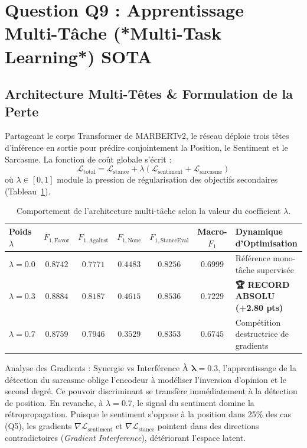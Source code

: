 \documentclass[11pt,a4paper]{article}
\begin{document}
\section{Question Q9 : Apprentissage Multi-Tâche (*Multi-Task Learning*) SOTA}

\subsection{Architecture Multi-Têtes \& Formulation de la Perte}
Partageant le corps Transformer de MARBERTv2, le réseau déploie trois têtes d'inférence en sortie pour prédire conjointement la Position, le Sentiment et le Sarcasme. La fonction de coût globale s'écrit :
\begin{equation}
    \mathcal{L}_{\text{total}} = \mathcal{L}_{\text{stance}} + \lambda \left(\mathcal{L}_{\text{sentiment}} + \mathcal{L}_{\text{sarcasme}}\right)
\end{equation}
où $\lambda \in [0, 1]$ module la pression de régularisation des objectifs secondaires (Tableau~\ref{tab:multitask}).

\begin{table}[htbp]
\centering
\caption{Comportement de l'architecture multi-tâche selon la valeur du coefficient $\lambda$.}
\label{tab:multitask}
\begin{tabularx}{\textwidth}{lcccccX}
\toprule
\textbf{Poids $\lambda$} & \textbf{$F_{1,\text{Favor}}$} & \textbf{$F_{1,\text{Against}}$} & \textbf{$F_{1,\text{None}}$} & \textbf{$F_{1,\text{StanceEval}}$} & \textbf{Macro-$F_1$} & \textbf{Dynamique d'Optimisation} \\
\midrule
$\lambda = 0.0$ & $0.8742$ & $0.7771$ & $0.4483$ & $0.8256$ & $0.6999$ & Référence mono-tâche supervisée \\
\textbf{$\lambda = 0.3$} & $\mathbf{0.8884}$ & $\mathbf{0.8187}$ & $\mathbf{0.4615}$ & $\mathbf{0.8536}$ & $\mathbf{0.7229}$ & \textbf{🏆 RECORD ABSOLU (+2.80 pts)} \\
$\lambda = 0.7$ & $0.8759$ & $0.7946$ & $0.3529$ & $0.8353$ & $0.6745$ & Compétition destructrice de gradients \\
\bottomrule
\end{tabularx}
\end{table}

\begin{infobox}{Analyse des Gradients : Synergie vs Interférence}
À $\mathbf{\lambda = 0.3}$, l'apprentissage de la détection du sarcasme oblige l'encodeur à modéliser l'inversion d'opinion et le second degré. Ce pouvoir discriminant se transfère immédiatement à la détection de position. En revanche, à $\lambda = 0.7$, le signal du sentiment domine la rétropropagation. Puisque le sentiment s'oppose à la position dans 25\% des cas (Q5), les gradients $\nabla \mathcal{L}_{\text{sentiment}}$ et $\nabla \mathcal{L}_{\text{stance}}$ pointent dans des directions contradictoires (\textit{Gradient Interference}), détériorant l'espace latent.
\end{infobox}
\end{document}
